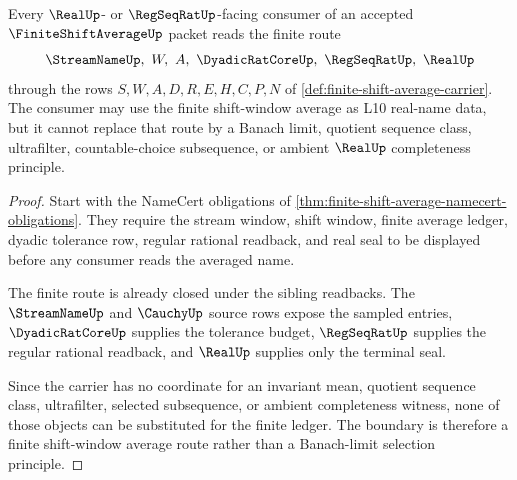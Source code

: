 \begin{theorem}
\label{thm:finite-shift-average-banach-limit-boundary}
Every $\RealUp$- or $\RegSeqRatUp$-facing consumer of an accepted $\FiniteShiftAverageUp$ packet reads the finite route
$$
\StreamNameUp,\ W,\ A,\ \DyadicRatCoreUp,\ \RegSeqRatUp,\ \RealUp
$$
through the rows $S,W,A,D,R,E,H,C,P,N$ of \autoref{def:finite-shift-average-carrier}. The consumer may use the finite shift-window average as L10 real-name data, but it cannot replace that route by a Banach limit, quotient sequence class, ultrafilter, countable-choice subsequence, or ambient $\RealUp$ completeness principle.
\end{theorem}
\begin{proof}
Start with the NameCert obligations of \autoref{thm:finite-shift-average-namecert-obligations}. They require the stream window, shift window, finite average ledger, dyadic tolerance row, regular rational readback, and real seal to be displayed before any consumer reads the averaged name.

The finite route is already closed under the sibling readbacks. The $\StreamNameUp$ and $\CauchyUp$ source rows expose the sampled entries, $\DyadicRatCoreUp$ supplies the tolerance budget, $\RegSeqRatUp$ supplies the regular rational readback, and $\RealUp$ supplies only the terminal seal.

Since the carrier has no coordinate for an invariant mean, quotient sequence class, ultrafilter, selected subsequence, or ambient completeness witness, none of those objects can be substituted for the finite ledger. The boundary is therefore a finite shift-window average route rather than a Banach-limit selection principle.
\end{proof}



